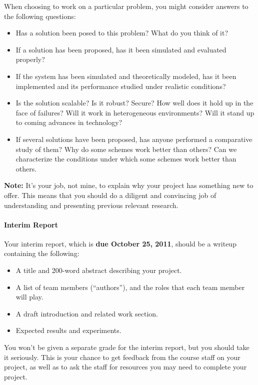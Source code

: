\documentclass[11pt]{article}
\begin{document}
When choosing to work on a particular problem, you might consider
answers to the following questions:
\begin{itemize}
\itemsep=-1pt
\item Has a solution been posed to this problem? What do you think of it?
\item If a solution has been proposed, has it been simulated and evaluated properly?
\item If the system has been simulated and theoretically modeled, has it
  been implemented and its performance studied under realistic
  conditions? 
\item Is the solution scalable? Is it robust? Secure? How well does it
  hold up in the face of failures? Will it work in heterogeneous
  environments? Will it stand up to coming advances in technology? 
\item If several solutions have been proposed, has anyone performed a
comparative study of them? Why do some schemes work better than others?
Can we characterize the conditions under which some schemes work better
than others. 
\end{itemize}

{\bf Note:} It's your job, not mine, to explain why your project has
something new to offer. This means that you should do a diligent and
convincing job of understanding and presenting previous relevant
research.

\paragraph{Interim Report} Your interim report, which is {\bf due
  October 25, 2011}, should be a writeup containing the following:
\begin{itemize}
\itemsep=-1pt
\item A title and 200-word abstract describing your project.
\item A list of team members (``authors''), and the roles that each team
  member will play.
\item A draft introduction and related work section.
\item Expected results and experiments.
\end{itemize}
\noindent
You won't be given a separate grade for the interim report, but you
should take it seriously.  This is your chance to get feedback from the
course staff on your project, as well as to ask the staff for resources
you may need to complete your project.
\end{document}
